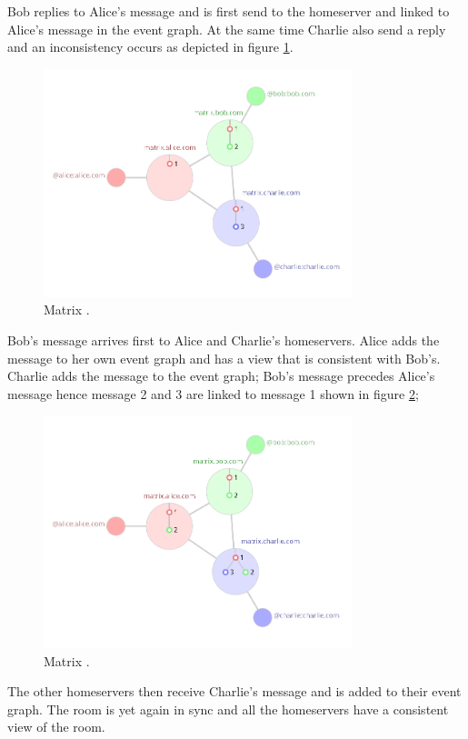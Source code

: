 Bob replies to Alice's message and is first send to the homeserver and linked to Alice's message in the event graph. At the same time Charlie also send a reply and an inconsistency occurs as depicted in figure \ref{fig:matrix2}.


\begin{figure}[H]
	\centering
	\includegraphics[width=9cm]{figures/matrix2.png}
	\caption{ Matrix \cite{matrixhome}.}
	\label{fig:matrix2}
\end{figure}


Bob's message arrives first to Alice and Charlie's homeservers. Alice adds the message to her own event graph and has a view that is consistent with Bob's. Charlie adds the message to the event graph; Bob's message precedes Alice's message hence message 2 and 3 are linked to message 1 shown in figure \ref{fig:matrix3};


\begin{figure}[H]
	\centering
	\includegraphics[width=9cm]{figures/matrix3.png}
	\caption{ Matrix \cite{matrixhome}.}
	\label{fig:matrix3}
\end{figure}


The other homeservers then receive Charlie's message and is added to their event graph. The room is yet again in sync and all the homeservers have a consistent view of the room.


